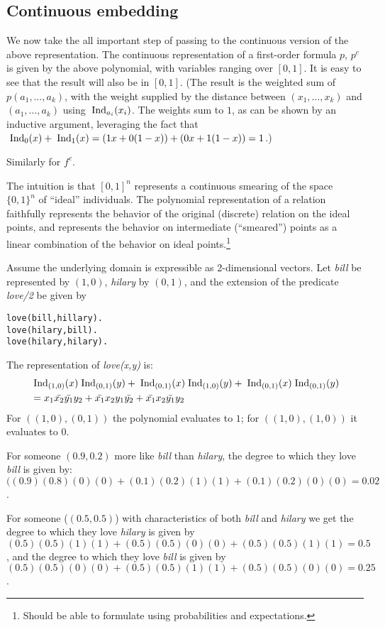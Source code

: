 \documentclass{article} %
\begin{document}
\subsection{Continuous embedding}
We now take the all important step of passing to the continuous version of the above representation. 
The continuous representation of a first-order formula $p$, $p^c$ is given by the above polynomial, with
variables ranging over $[0,1]$. It is easy to see that the result will also be in $[0,1]$. (The result is the weighted sum of $p(a_1, \ldots, 
  a_k)$, with the weight supplied by the distance between $(x_1,
  \ldots, x_k)$ and $(a_1, \ldots, a_k)$ using $\;\mbox{Ind}_{a_i}(x_i)$. The
  weights sum to $1$, as can be shown by an inductive argument,
  leveraging the fact that $\;\mbox{Ind}_{0}(x) + \;\mbox{Ind}_{1}(x)=(1x+0(1-x))+(0x+1(1-x))=1$.)

Similarly for $f^c$. 

The intuition is that $[0,1]^n$ represents a continuous smearing of the space $\{0,1\}^n$ of ``ideal'' individuals. The polynomial representation of a relation faithfully represents the behavior of the original (discrete) relation on the ideal points, and represents the behavior on intermediate (``smeared'') points as a linear combination of the behavior on ideal points.\footnote{Should be able to formulate using probabilities and expectations.}

\begin{example}
Assume the underlying domain is expressible as 2-dimensional vectors. Let {\em bill} be represented by $(1, 0)$, {\em hilary} by $(0,1)$, and the extension of the predicate {\em love/2} be given by
\begin{lstlisting}
love(bill,hillary).
love(hilary,bill).
love(hilary,hilary).
\end{lstlisting}
The representation of {\em love(x,y)} is:
\begin{align*}
&\;\mbox{Ind}_{(1,0)}(x)\;\mbox{Ind}_{(0,1)}(y) + \;\mbox{Ind}_{(0,1)}(x)\;\mbox{Ind}_{(1,0)}(y) + \;\mbox{Ind}_{(0,1)}(x)\;\mbox{Ind}_{(0,1)}(y)  \\
&= x_1\bar{x_2}\bar{y_1}y_2 + \bar{x_1}x_2y_1\bar{y_2} + \bar{x_1}x_2\bar{y_1}y_2
\end{align*}
For $((1,0),(0,1))$ the polynomial evaluates to $1$; for 
$((1,0),(1,0))$ it evaluates to $0$. 

For someone $(0.9,0.2)$ more like {\em bill} than {\em hilary}, the degree to which they love
{\em bill} is given by: 
$((0.9)(0.8)(0)(0) + (0.1)(0.2)(1)(1) + (0.1)(0.2)(0)(0)=0.02$.

For someone ($(0.5,0.5)$) with characteristics of both {\em bill} and {\em hilary} we get the degree to which they love {\em hilary}  is given by
$(0.5)(0.5)(1)(1)+(0.5)(0.5)(0)(0)+(0.5)(0.5)(1)(1)=0.5$, and the degree to which they love {\em bill} is given by $(0.5)(0.5)(0)(0) + (0.5)(0.5)(1)(1) + (0.5)(0.5)(0)(0)=0.25$.

\end{example}
\end{document}
